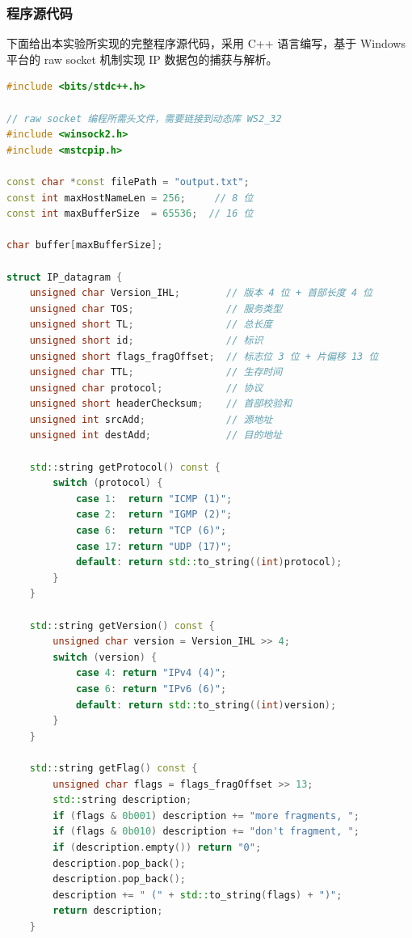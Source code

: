 \documentclass[UTF8,12pt,a4paper]{ctexart}
\begin{document}
\subsubsection{程序源代码}

下面给出本实验所实现的完整程序源代码，采用 C++ 语言编写，基于 Windows 平台的 raw socket 机制实现 IP 数据包的捕获与解析。

\begin{lstlisting}[language=C++,caption={IP 数据包捕获与解析程序源码}]
#include <bits/stdc++.h>

// raw socket 编程所需头文件，需要链接到动态库 WS2_32
#include <winsock2.h>
#include <mstcpip.h>

const char *const filePath = "output.txt";
const int maxHostNameLen = 256;     // 8 位
const int maxBufferSize  = 65536;  // 16 位

char buffer[maxBufferSize];

struct IP_datagram {
    unsigned char Version_IHL;        // 版本 4 位 + 首部长度 4 位
    unsigned char TOS;                // 服务类型
    unsigned short TL;                // 总长度
    unsigned short id;                // 标识
    unsigned short flags_fragOffset;  // 标志位 3 位 + 片偏移 13 位
    unsigned char TTL;                // 生存时间
    unsigned char protocol;           // 协议
    unsigned short headerChecksum;    // 首部校验和
    unsigned int srcAdd;              // 源地址
    unsigned int destAdd;             // 目的地址

    std::string getProtocol() const {
        switch (protocol) {
            case 1:  return "ICMP (1)";
            case 2:  return "IGMP (2)";
            case 6:  return "TCP (6)";
            case 17: return "UDP (17)";
            default: return std::to_string((int)protocol);
        }
    }

    std::string getVersion() const {
        unsigned char version = Version_IHL >> 4;
        switch (version) {
            case 4: return "IPv4 (4)";
            case 6: return "IPv6 (6)";
            default: return std::to_string((int)version);
        }
    }

    std::string getFlag() const {
        unsigned char flags = flags_fragOffset >> 13;
        std::string description;
        if (flags & 0b001) description += "more fragments, ";
        if (flags & 0b010) description += "don't fragment, ";
        if (description.empty()) return "0";
        description.pop_back();
        description.pop_back();
        description += " (" + std::to_string(flags) + ")";
        return description;
    }


\end{lstlisting}
\end{document}
